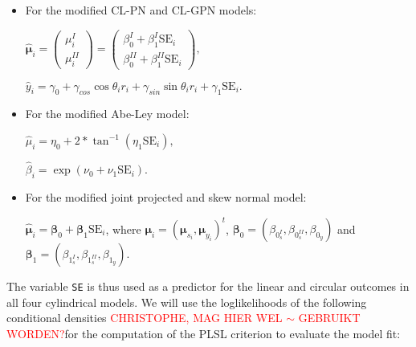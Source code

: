 \documentclass[11pt,]{article}
\begin{document}
\begin{itemize}
\item For the modified CL-PN and CL-GPN models:

$\hat{\boldsymbol{\mu}}_{i} = \begin{pmatrix}
  \mu_{i}^{I}  \\
\mu_{i}^{II}
 \end{pmatrix}=\begin{pmatrix}
  \beta_0^{I} + \beta_1^{I}\text{SE}_i  \\
  \beta_0^{II} + \beta_1^{II}\text{SE}_i
 \end{pmatrix},$

$\hat{y}_i = \gamma_0 + \gamma_{cos}\cos\theta_ir_i + \gamma_{sin}\sin\theta_ir_i + \gamma_1\text{SE}_i.$

\item For the modified Abe-Ley model:

$\hat{\mu}_{i} = \eta_0 + 2 * \tan^{-1}(\eta_1\text{SE}_i),$

$\hat{\beta}_{i} = \exp(\nu_0 + \nu_1\text{SE}_i).$

\item For the modified joint projected and skew normal model:

$\hat{\boldsymbol{\mu}}_{i} = \boldsymbol{\beta}_0 + \boldsymbol{\beta}_1\text{SE}_i$, where $\boldsymbol{\mu}_i = (\boldsymbol{\mu}_{s_i}, \boldsymbol{\mu}_{y_i})^t$, $\boldsymbol{\beta}_0 = (\beta_{0_s^{I}}, \beta_{0_s^{II}},\beta_{0_y})$ and $\boldsymbol{\beta}_1 = (\beta_{1_s^{I}}, \beta_{1_s^{II}},\beta_{1_y})$.
\end{itemize}

The variable \verb|SE| is thus used as a predictor for the linear and
circular outcomes in all four cylindrical models. We will use the
loglikelihoods of the following conditional densities
\textcolor{red}{CHRISTOPHE, MAG HIER WEL $\sim$ GEBRUIKT WORDEN?}for the
computation of the PLSL criterion to evaluate the model fit:
\end{document}
